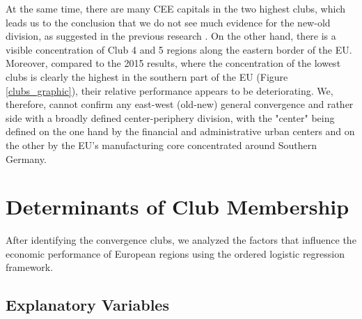 \documentclass[11pt]{article}
\begin{document}
At the same time, there are many CEE capitals in the two highest clubs, which leads us to the conclusion that we do not see much evidence for the new-old division, as suggested in the previous research \citep{eckey2007convergence}.
On the other hand, there is a visible concentration of Club 4 and 5 regions along the eastern border of the EU. Moreover, compared to the 2015 results, where the concentration of the lowest clubs is clearly the highest in the southern part of the EU (Figure \ref{clubs_graphic}), their relative performance appears to be deteriorating. We, therefore, cannot confirm any east-west (old-new) general convergence and rather side with a broadly defined center-periphery division, with the "center" being defined on the one hand by the financial and administrative urban centers and on the other by the EU's manufacturing core concentrated around Southern Germany.



\section{Determinants of Club Membership}
\label{Determinants of club membership}


 
After identifying the convergence clubs, we analyzed the factors that influence the economic performance of European regions using the ordered logistic regression framework.

\subsection{Explanatory Variables}
\end{document}
